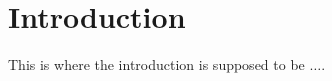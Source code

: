 \documentclass[../main.tex]{subfiles}
\begin{document}
\pagebreak
\section{Introduction}
This is where the introduction is supposed to be $\dots$.\cite{einstein}
\end{document}
